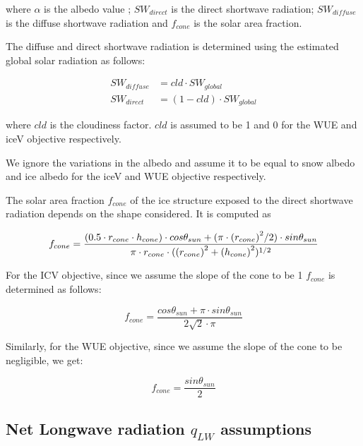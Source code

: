 \documentclass[tc, manuscript]{copernicus}
\begin{document}
where $\alpha$ is the albedo value ; $SW_{direct}$ is the direct shortwave radiation; $SW_{diffuse}$ is the
diffuse shortwave radiation and $f_{cone}$ is the solar area fraction.

The diffuse and direct shortwave radiation is determined using the estimated global solar radiation as follows:

\begin{equation}
\begin{split}
  SW_{diffuse} &= cld \cdot SW_{global}\\
  SW_{direct} &= (1-cld) \cdot SW_{global}
\end{split}
\end{equation}

where $cld$ is the cloudiness factor. $cld$ is assumed to be 1 and 0 for the WUE and iceV objective
respectively.

We ignore the variations in the albedo and assume it to be equal to snow albedo and ice albedo for the iceV and
WUE objective respectively. 

The solar area fraction $f_{cone}$ of the ice structure exposed to the direct shortwave radiation depends on the
shape considered. It is computed as

\begin{equation}
		f_{cone} =\frac{(0.5 \cdot r_{cone} \cdot h_{cone}) \cdot cos \theta_{sun} +(\pi \cdot
			{(r_{cone})}^2/2) \cdot sin \theta_{sun} }{\pi \cdot r_{cone} \cdot ({(r_{cone})}^2+{(h_{cone})}^2)^{1/2}}\\
\end{equation}

For the ICV objective, since we assume the slope of the cone to be 1 $f_{cone}$ is determined
as follows:

\begin{equation}
		f_{cone} =\frac{ cos \theta_{sun} + \pi \cdot sin \theta_{sun} }{2\sqrt{2} \cdot \pi }
\end{equation}

Similarly, for the WUE objective, since we assume the slope of the cone to be negligible, we get:

\begin{equation}
		f_{cone} =\frac{ sin \theta_{sun} }{2 }
\end{equation}

\subsection{Net Longwave radiation \texorpdfstring{$q_{LW}$}{Lg} assumptions} \label{sec:LW}
\end{document}
